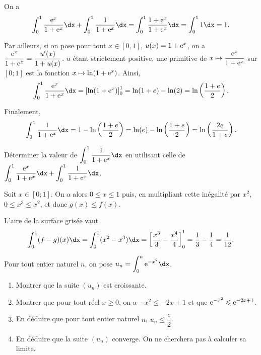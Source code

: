 \documentclass[11pt,fleqn, openany]{book} %
\begin{document}
\begin{solution}
On a \[\displaystyle \int_{0}^1 \dfrac{\e^x}{1+\e^x}\dx +  \int _0^1 \dfrac{1}{1+\e^x}\dx = \int _0^1 \dfrac{1+\e^x}{1+\e^x}\dx = \int _0^1 1\dx = 1 .\]

Par ailleurs, si on pose pour tout \(x\in [0,1]\), \(u(x)=1+\mathrm{e}^x\), on a \(\dfrac{\mathrm{e}^x}{1+\mathrm{e}^x}=\dfrac{u'(x)}{1+u(x)}\). \(u\) étant strictement positive, une primitive de \(x \mapsto \dfrac{\mathrm{e}^x}{1+\mathrm{e}^x}\) sur \([0;1]\) est la fonction \(x \mapsto \ln(1+\mathrm{e}^x)\). Ainsi, 
\[\displaystyle \int_{0}^1 \dfrac{\e^x}{1+\e^x}\dx = \left[ \ln(1+\e^x)\right]_0^1 = \ln(1+e)-\ln(2)=\ln\left(\dfrac{1+e}{2}\right) .\]

Finalement, 
\[  \int _0^1 \dfrac{1}{1+\e^x}\dx = 1 - \ln\left(\dfrac{1+e}{2}\right) = \ln(e)-\ln\left(\dfrac{1+e}{2}\right) = \ln\left(\dfrac{2e}{1+e}\right) .\]

\end{solution}



\begin{exercise}Déterminer la valeur de $\displaystyle\int _0^1 \dfrac{1}{1+\e^x}\dx$ en utilisant celle de $\displaystyle \int_{0}^1 \dfrac{\e^x}{1+\e^x}\dx +  \int _0^1 \dfrac{1}{1+\e^x}\dx$.\end{exercise}

\begin{solution}
Soit \(x\in[0;1]\). On a alors \(0\leqslant x \leqslant 1\) puis, en multipliant cette inégalité par \(x^2\), \(0\leqslant x^3 \leqslant x^2\), et donc \(g(x)\leqslant f(x)\).

L'aire de la surface grisée vaut \[\int_0^1 (f-g)(x)\dx = \int_0^1 (x^2-x^3)\dx = \left[\dfrac{x^3}{3}-\dfrac{x^4}{4}\right]_0^1=\dfrac{1}{3}-\dfrac{1}{4}=\dfrac{1}{12}.\]
\newpage \end{solution}



\begin{exercise}
Pour tout entier naturel  $n$, on pose $u_n=\displaystyle \int _{0}^n\e^{-x^2}\dx$.
\begin{enumerate}
\item Montrer que la suite $(u_n)$ est croissante.
\item Montrer que pour tout réel $x\geqslant 0$, on a $-x^2 \leqslant -2x+1$ et que $\mathrm{e}^{-x^2}\leqslant \mathrm{e}^{-2x+1}$.
\item En déduire que pour tout entier naturel $n$, $u_n \leqslant \dfrac{e}{2}$.
\item En déduire que la suite $(u_n)$ converge. On ne cherchera pas à calculer sa limite.
\end{enumerate}\end{exercise}
\end{document}
